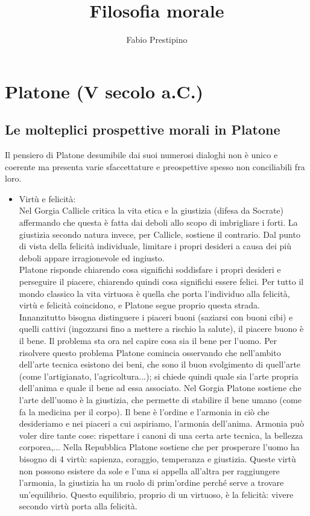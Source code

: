 \documentclass[10pt,a4paper]{article}
\author{Fabio Prestipino}
\title{Filosofia morale}
\begin{document}
	\maketitle
\section{Platone (V secolo a.C.)}
\subsection{Le molteplici prospettive morali in Platone}
Il pensiero di Platone desumibile dai suoi numerosi dialoghi non è unico e coerente ma presenta varie sfaccettature e preospettive spesso non conciliabili fra loro.
\begin{itemize}
	\item Virtù e felicità:\\
	Nel Gorgia Callicle critica la vita etica e la giustizia (difesa da Socrate) affermando che questa è fatta dai deboli allo scopo di imbrigliare i forti. La giustizia secondo natura invece, per Callicle, sostiene il contrario. Dal punto di vista della felicità individuale, limitare i propri desideri a causa dei più deboli appare irragionevole ed ingiusto.\\
	Platone risponde chiarendo cosa significhi soddisfare i propri desideri e perseguire il piacere, chiarendo quindi cosa significhi essere felici. Per tutto il mondo classico la vita virtuosa è quella che porta l'individuo alla felicità, virtù e felicità coincidono, e Platone segue proprio questa strada. Innanzitutto bisogna distinguere i piaceri buoni (saziarsi con buoni cibi) e quelli cattivi (ingozzarsi fino a mettere a rischio la salute), il piacere buono è il bene. Il problema sta ora nel capire cosa sia il bene per l'uomo. Per risolvere questo problema Platone comincia osservando che nell'ambito dell'arte tecnica esistono dei beni, che sono il buon svolgimento di quell'arte (come l'artigianato, l'agricoltura...); si chiede quindi quale sia l'arte propria dell'anima e quale il bene ad essa associato. Nel Gorgia Platone sostiene che l'arte dell'uomo è la giustizia, che permette di stabilire il bene umano (come fa la medicina per il corpo). Il bene è l'ordine e l'armonia in ciò che desideriamo e nei piaceri a cui aspiriamo, l'armonia dell'anima. Armonia può voler dire tante cose: rispettare i canoni di una certa arte tecnica, la bellezza corporea,...
	Nella Repubblica Platone sostiene che per prosperare l'uomo ha bisogno di 4 virtù: sapienza, coraggio, temperanza e giustizia. Queste virtù non possono esistere da sole e l'una si appella all'altra per raggiungere l'armonia, la giustizia ha un ruolo di prim'ordine perché serve a trovare un'equilibrio. Questo equilibrio, proprio di un virtuoso, è la felicità: vivere secondo virtù porta alla felicità.\\

\end{itemize}
\end{document}
